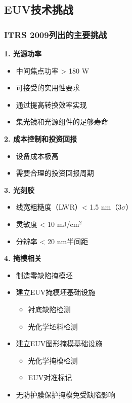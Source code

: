 \documentclass[UTF8,12pt,a4paper]{ctexart}
\begin{document}
\subsection{EUV技术挑战}

\subsubsection{ITRS 2009列出的主要挑战}

\textbf{1. 光源功率}
\begin{itemize}
    \item 中间焦点功率 > 180 W
    \item 可接受的实用性要求
    \item 通过提高转换效率实现
    \item 集光镜和光源组件的足够寿命
\end{itemize}

\textbf{2. 成本控制和投资回报}
\begin{itemize}
    \item 设备成本极高
    \item 需要合理的投资回报周期
\end{itemize}

\textbf{3. 光刻胶}
\begin{itemize}
    \item 线宽粗糙度（LWR）< 1.5 nm（3$\sigma$）
    \item 灵敏度 < 10 mJ/cm$^2$
    \item 分辨率 < 20 nm半间距
\end{itemize}

\textbf{4. 掩模相关}
\begin{itemize}
    \item 制造零缺陷掩模坯
    \item 建立EUV掩模坯基础设施
    \begin{itemize}
        \item 衬底缺陷检测
        \item 光化学坯料检测
    \end{itemize}
    \item 建立EUV图形掩模基础设施
    \begin{itemize}
        \item 光化学掩模检测
        \item EUV对准标记
    \end{itemize}
    \item 无防护膜保护掩模免受缺陷影响
\end{itemize}
\end{document}
